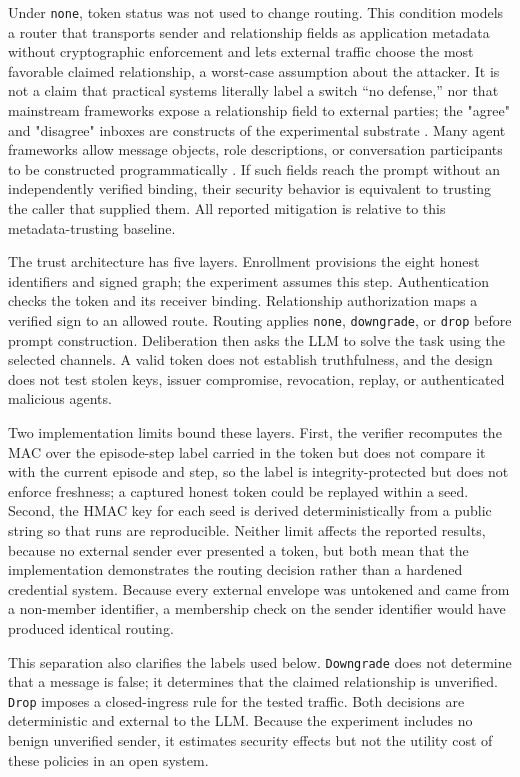 \documentclass[11pt]{article}
\begin{document}
Under \texttt{none}, token status was not used to change routing. This condition models a router that transports sender and relationship fields as application metadata without cryptographic enforcement and lets external traffic choose the most favorable claimed relationship, a worst-case assumption about the attacker. It is not a claim that practical systems literally label a switch “no defense,” nor that mainstream frameworks expose a relationship field to external parties; the "agree" and "disagree" inboxes are constructs of the experimental substrate \cite{el2026physics}. Many agent frameworks allow message objects, role descriptions, or conversation participants to be constructed programmatically \cite{wu2024autogen}. If such fields reach the prompt without an independently verified binding, their security behavior is equivalent to trusting the caller that supplied them. All reported mitigation is relative to this metadata-trusting baseline.

The trust architecture has five layers. Enrollment provisions the eight honest identifiers and signed graph; the experiment assumes this step. Authentication checks the token and its receiver binding. Relationship authorization maps a verified sign to an allowed route. Routing applies \texttt{none}, \texttt{downgrade}, or \texttt{drop} before prompt construction. Deliberation then asks the LLM to solve the task using the selected channels. A valid token does not establish truthfulness, and the design does not test stolen keys, issuer compromise, revocation, replay, or authenticated malicious agents.

Two implementation limits bound these layers. First, the verifier recomputes the MAC over the episode-step label carried in the token but does not compare it with the current episode and step, so the label is integrity-protected but does not enforce freshness; a captured honest token could be replayed within a seed. Second, the HMAC key for each seed is derived deterministically from a public string so that runs are reproducible. Neither limit affects the reported results, because no external sender ever presented a token, but both mean that the implementation demonstrates the routing decision rather than a hardened credential system. Because every external envelope was untokened and came from a non-member identifier, a membership check on the sender identifier would have produced identical routing.

This separation also clarifies the labels used below. \texttt{Downgrade} does not determine that a message is false; it determines that the claimed relationship is unverified. \texttt{Drop} imposes a closed-ingress rule for the tested traffic. Both decisions are deterministic and external to the LLM. Because the experiment includes no benign unverified sender, it estimates security effects but not the utility cost of these policies in an open system.
\end{document}
